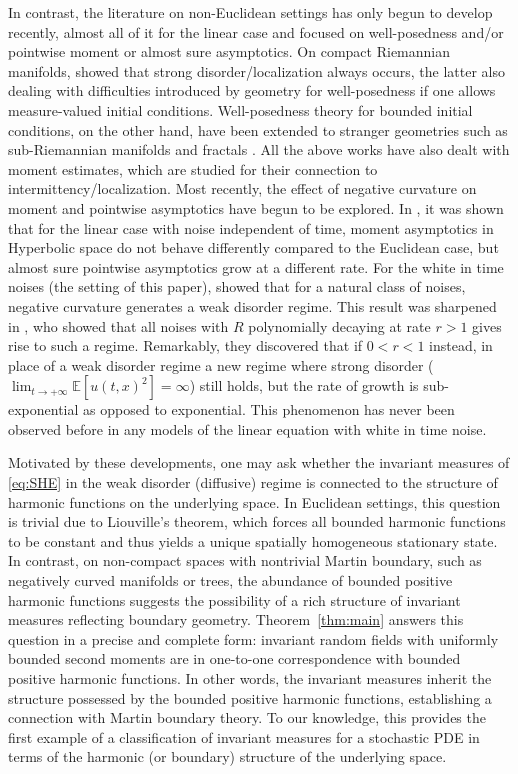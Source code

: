 \documentclass{article}
\numberwithin{theorem}{section}
\def\EE{\mathbb{E}} %
\begin{document}
In contrast, the literature on non-Euclidean settings has only begun to develop recently, almost all of it for the linear case and focused on well-posedness and/or pointwise moment or almost sure asymptotics. On compact Riemannian manifolds, \cite{TV02,CO25} showed that strong disorder/localization always occurs, the latter also dealing with difficulties introduced by geometry for well-posedness if one allows measure-valued initial conditions. Well-posedness theory for bounded initial conditions, on the other hand, have been extended to stranger geometries such as sub-Riemannian manifolds\cite{BOTW-Heisenberg} and fractals \cite{BCHOTW,HY16}. All the above works have also dealt with moment estimates, which are studied for their connection to intermittency/localization. Most recently, the effect of negative curvature on moment and pointwise asymptotics have begun to be explored. In \cite{GX25,GWX25}, it was shown that for the linear case with noise independent of time, moment asymptotics in Hyperbolic space do not behave differently compared to the Euclidean case, but almost sure pointwise asymptotics grow at a different rate. For the white in time noises (the setting of this paper), \cite{BCO24} showed that for a natural class of noises, negative curvature generates a weak disorder regime. This result was sharpened in \cite{geng-ouyang}, who showed that all noises with $R$ polynomially decaying at rate $r>1$ gives rise to such a regime. Remarkably, they discovered that if $0<r<1$ instead, in place of a weak disorder regime a new regime where strong disorder (\(\lim_{t\to+\infty}\EE[u(t,x)^2]=\infty\)) still holds, but the rate of growth is sub-exponential as opposed to exponential. This phenomenon has never been observed before in any models of the linear equation with white in time noise.

Motivated by these developments, one may ask whether the invariant measures of \eqref{eq:SHE} in the weak disorder (diffusive) regime is connected to the structure of harmonic functions on the underlying space. In Euclidean settings, this question is trivial due to Liouville’s theorem, which forces all bounded harmonic functions to be constant and thus yields a unique spatially homogeneous stationary state. In contrast, on non-compact spaces with nontrivial Martin boundary, such as negatively curved manifolds\cite{Ancona87,AndersonSchoen85} or trees\cite{Croydon2008}, the abundance of bounded positive harmonic functions suggests the possibility of a rich structure of invariant measures reflecting boundary geometry. Theorem~\ref{thm:main} answers this question in a precise and complete form: invariant random fields with uniformly bounded second moments are in one-to-one correspondence with bounded positive harmonic functions. In other words, the invariant measures inherit the structure possessed by the bounded positive harmonic functions, establishing a connection with Martin boundary theory. To our knowledge, this provides the first example of a classification of invariant measures for a stochastic PDE in terms of the harmonic (or boundary) structure of the underlying space.
\end{document}
